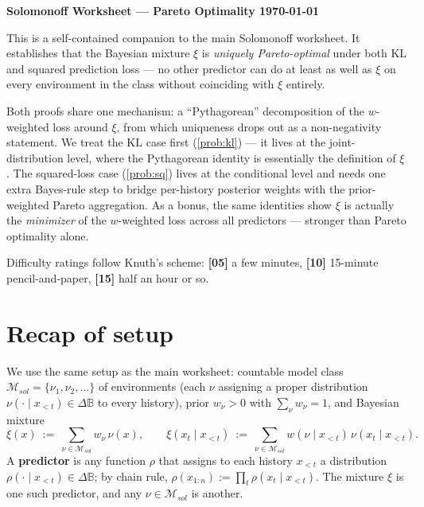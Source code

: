\documentclass[fontsize=11pt, parskip=half]{scrartcl}
\theoremstyle{definition}
\newcommand{\mytitle}[1]{{\noindent\Large\textbf{#1}}}
\newcommand{\Msol}{\mathcal{M}_{sol}}
\begin{document}
\mytitle{Solomonoff Worksheet --- Pareto Optimality \hfill \today}

\medskip
\noindent
This is a self-contained companion to the main Solomonoff worksheet. It
establishes that the Bayesian mixture $\xi$ is \emph{uniquely Pareto-optimal}
under both KL and squared prediction loss --- no other predictor can do at
least as well as $\xi$ on every environment in the class without coinciding
with $\xi$ entirely.

Both proofs share one mechanism: a ``Pythagorean'' decomposition of the
$w$-weighted loss around $\xi$, from which uniqueness drops out as a
non-negativity statement. We treat the KL case first (\cref{prob:kl}) ---
it lives at the joint-distribution level, where the Pythagorean identity is
essentially the definition of $\xi$. The squared-loss case (\cref{prob:sq})
lives at the conditional level and needs one extra Bayes-rule step to bridge
per-history posterior weights with the prior-weighted Pareto aggregation. As
a bonus, the same identities show $\xi$ is actually the \emph{minimizer} of
the $w$-weighted loss across all predictors --- stronger than Pareto
optimality alone.

Difficulty ratings follow Knuth's scheme: \textbf{[05]} a few minutes,
\textbf{[10]} 15-minute pencil-and-paper, \textbf{[15]} half an hour or so.

\section*{Recap of setup}

We use the same setup as the main worksheet: countable model class
$\Msol = \{\nu_1, \nu_2, \dots\}$ of environments (each $\nu$ assigning a
proper distribution $\nu(\cdot \mid x_{<t}) \in \Delta\mathbb{B}$ to every
history), prior $w_\nu > 0$ with
$\sum_\nu w_\nu = 1$, and Bayesian mixture
\[
  \xi(x) ~:=~ \sum_{\nu \in \Msol} w_\nu \, \nu(x),
  \qquad
  \xi(x_t \mid x_{<t}) ~:=~ \sum_{\nu \in \Msol} w(\nu \mid x_{<t}) \, \nu(x_t \mid x_{<t}).
\]
A \textbf{predictor} is any function $\rho$ that assigns to each history
$x_{<t}$ a distribution $\rho(\cdot \mid x_{<t}) \in \Delta\mathbb{B}$; by
chain rule, $\rho(x_{1:n}) := \prod_t \rho(x_t \mid x_{<t})$. The mixture
$\xi$ is one such predictor, and any $\nu \in \Msol$ is another.
\end{document}
